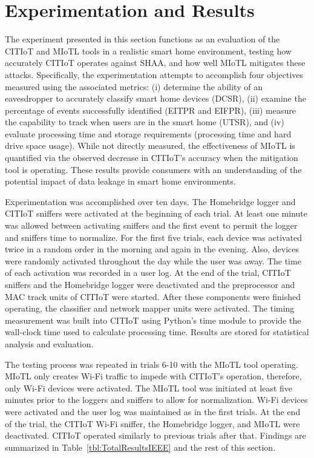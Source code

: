 \documentclass[journal]{./IEEEtran/IEEEtran}
\begin{document}
\section{Experimentation and Results}\label{results}
The experiment presented in this section functions as an evaluation of the \ac{CITIoT} and \ac{MIoTL} tools in a realistic smart home environment, testing how accurately \ac{CITIoT} operates against \ac{SHAA}, and how well \ac{MIoTL} mitigates these attacks. Specifically, the experimentation attempts to accomplish four objectives measured using the associated metrics: (i) determine the ability of an eavesdropper to accurately classify smart home devices (\ac{DCSR}), (ii) examine the percentage of events successfully identified (\ac{EITPR} and \ac{EIFPR}), (iii) measure the capability to track when users are in the smart home (\ac{UTSR}), and (iv) evaluate processing time and storage requirements (processing time and hard drive space usage). While not directly measured, the effectiveness of \ac{MIoTL} is quantified via the observed decrease in \ac{CITIoT}'s accuracy when the mitigation tool is operating. These results provide consumers with an understanding of the potential impact of data leakage in smart home environments.

Experimentation was accomplished over ten days. The Homebridge logger and \ac{CITIoT} sniffers were activated at the beginning of each trial. At least one minute was allowed between activating sniffers and the first event to permit the logger and sniffers time to normalize. For the first five trials, each device was activated twice in a random order in the morning and again in the evening. Also, devices were randomly activated throughout the day while the user was away. The time of each activation was recorded in a user log. At the end of the trial, \ac{CITIoT} sniffers and the Homebridge logger were deactivated and the preprocessor and \ac{MAC} track units of \ac{CITIoT} were started. After these components were finished operating, the classifier and network mapper units were activated. The timing measurement was built into \ac{CITIoT} using Python's time module to provide the wall-clock time used to calculate processing time. Results are stored for statistical analysis and evaluation.

The testing process was repeated in trials 6-10 with the \ac{MIoTL} tool operating. \ac{MIoTL} only creates Wi-Fi traffic to impede with \ac{CITIoT}'s operation, therefore, only Wi-Fi devices were activated. The \ac{MIoTL} tool was initiated at least five minutes prior to the loggers and sniffers to allow for normalization. Wi-Fi devices were activated and the user log was maintained as in the first trials. At the end of the trial, the \ac{CITIoT} Wi-Fi sniffer, the Homebridge logger, and \ac{MIoTL} were deactivated. \ac{CITIoT} operated similarly to previous trials after that. Findings are summarized in Table~\ref{tbl:TotalResultsIEEE} and the rest of this section.
\end{document}
